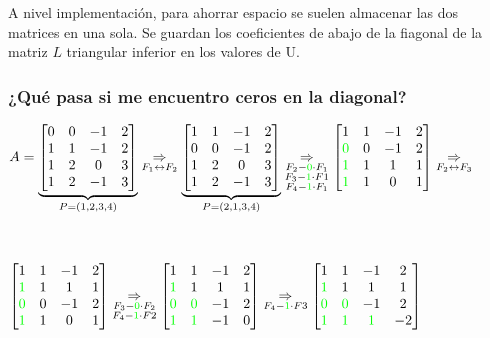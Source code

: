 \documentclass[]{article}
\begin{document}
A nivel implementación, para ahorrar espacio se suelen almacenar las dos matrices en una sola. Se guardan los coeficientes de abajo de la fiagonal de la matriz $L$ triangular inferior en los valores de U.


\subsubsection{¿Qué pasa si me encuentro ceros en la diagonal?}
\begin{center}
	$A=\underbrace{\begin{bmatrix}
		0&0&-1&2\\
		1&1&-1&2\\
		1&2&0&3\\
		1&2&-1&3
	\end{bmatrix}}_{P=(1,2,3,4)}\underset{F_1 \leftrightarrow F_2}{\Rightarrow}
	\underbrace{\begin{bmatrix}
		1&1&-1&2\\
		0&0&-1&2\\
		1&2&0&3\\
		1&2&-1&3
	\end{bmatrix}}_{P=(2,1,3,4)}\underset{\substack{F_2-\mathbin{\color{green}{0}}\cdot F_1 \\ F_3 - \mathbin{\color{green}{1}}\cdot F1 \\ F_4 - \mathbin{\color{green}{1}}\cdot F_1}}{\Rightarrow}
	\begin{bmatrix}
		1&1&-1&2\\
		\mathbin{\color{green}{0}}&0&-1&2\\
		\mathbin{\color{green}{1}}&1&1&1\\
		\mathbin{\color{green}{1}}&1&0&1
	\end{bmatrix}\underset{F_2 \leftrightarrow F_3}{\Rightarrow}$

	~\newline

	$
	\begin{bmatrix}
		1&1&-1&2\\
		\mathbin{\color{green}{1}}&1&1&1\\
		\mathbin{\color{green}{0}}&0&-1&2\\
		\mathbin{\color{green}{1}}&1&0&1
	\end{bmatrix}\underset{\substack{F_3-\mathbin{\color{green}{0}}\cdot F_2 \\ F_4 - \mathbin{\color{green}{1}}\cdot F2}}{\Rightarrow}
	\begin{bmatrix}
		1&1&-1&2\\
		\mathbin{\color{green}{1}}&1&1&1\\
		\mathbin{\color{green}{0}}&\mathbin{\color{green}{0}}&-1&2\\
		\mathbin{\color{green}{1}}&\mathbin{\color{green}{1}}&-1&0
	\end{bmatrix}\underset{F_4-\mathbin{\color{green}{1}}\cdot F3}{\Rightarrow}
	\begin{bmatrix}
		1&1&-1&2\\
		\mathbin{\color{green}{1}}&1&1&1\\
		\mathbin{\color{green}{0}}&\mathbin{\color{green}{0}}&-1&2\\
		\mathbin{\color{green}{1}}&\mathbin{\color{green}{1}}&\mathbin{\color{green}{1}}&-2
	\end{bmatrix}$
\end{center}
\end{document}
